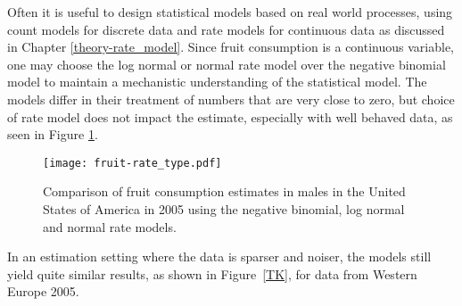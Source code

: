 Often it is useful to design statistical models based on real world
processes, using count models for discrete data and rate models for
continuous data as discussed in Chapter \ref{theory-rate_model}.
Since fruit consumption is a continuous variable, one may choose the
log normal or normal rate model over the negative binomial model to
maintain a mechanistic understanding of the statistical model.  The
models differ in their treatment of numbers that are very close to
zero, but choice of rate model does not impact the estimate,
especially with well behaved data, as seen in Figure
\ref{fig:app-fruit rate type}.

    \begin{figure}[h]
        \begin{center}
            \texttt{[image: fruit-rate\_type.pdf]}
            \caption{Comparison of fruit consumption estimates in
              males in the United States of America in 2005 using the
              negative binomial, log normal and normal rate models.}
            \label{fig:app-fruit rate type}
        \end{center}
    \end{figure} 

In an estimation setting where the data is sparser and noiser, the
models still yield quite similar results, as shown in Figure~\ref{TK},
for data from Western Europe 2005.
